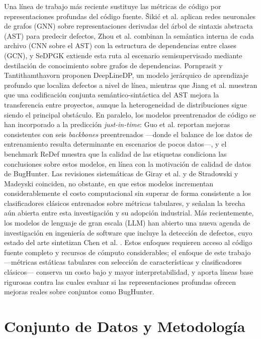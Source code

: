 \documentclass[conference,a4paper]{IEEEtran}
\begin{document}
Una línea de trabajo más reciente sustituye las métricas de código por representaciones profundas del código fuente. {\v S}iki\'c et al. \cite{sikic2022} aplican redes neuronales de grafos (GNN) sobre representaciones derivadas del árbol de sintaxis abstracta (AST) para predecir defectos, Zhou et al. \cite{zhou2022} combinan la semántica interna de cada archivo (CNN sobre el AST) con la estructura de dependencias entre clases (GCN), y SeDPGK \cite{liu2024sedpgk} extiende esta ruta al escenario semisupervisado mediante destilación de conocimiento sobre grafos de dependencias. Pornprasit y Tantithamthavorn \cite{pornprasit2023} proponen DeepLineDP, un modelo jerárquico de aprendizaje profundo que localiza defectos a nivel de línea, mientras que Jiang et al. \cite{jiang2024} muestran que una codificación conjunta semántico-sintáctica del AST mejora la transferencia entre proyectos, aunque la heterogeneidad de distribuciones sigue siendo el principal obstáculo. En paralelo, los modelos preentrenados de código se han incorporado a la predicción \textit{just-in-time}: Guo et al. \cite{guo2023} reportan mejoras consistentes con seis \textit{backbones} preentrenados ---donde el balance de los datos de entrenamiento resulta determinante en escenarios de pocos datos---, y el benchmark ReDef \cite{nam2026} muestra que la calidad de las etiquetas condiciona las conclusiones sobre estos modelos, en línea con la motivación de calidad de datos de BugHunter. Las revisiones sistemáticas de Giray et al. \cite{giray2023} y de Stradowski y Madeyski \cite{stradowski2023} coinciden, no obstante, en que estos modelos incrementan considerablemente el costo computacional sin superar de forma consistente a los clasificadores clásicos entrenados sobre métricas tabulares, y señalan la brecha aún abierta entre esta investigación y su adopción industrial. Más recientemente, los modelos de lenguaje de gran escala (LLM) han abierto una nueva agenda de investigación en ingeniería de software \cite{hou2024,fan2023} que incluye la detección de defectos, cuyo estado del arte sintetizan Chen et al. \cite{chen2026llm}. Estos enfoques requieren acceso al código fuente completo y recursos de cómputo considerables; el enfoque de este trabajo ---métricas estáticas tabulares con selección de características y clasificadores clásicos--- conserva un costo bajo y mayor interpretabilidad, y aporta líneas base rigurosas contra las cuales evaluar si las representaciones profundas ofrecen mejoras reales sobre conjuntos como BugHunter.

\section{Conjunto de Datos y Metodología}
\label{sec:metodologia}
\end{document}
